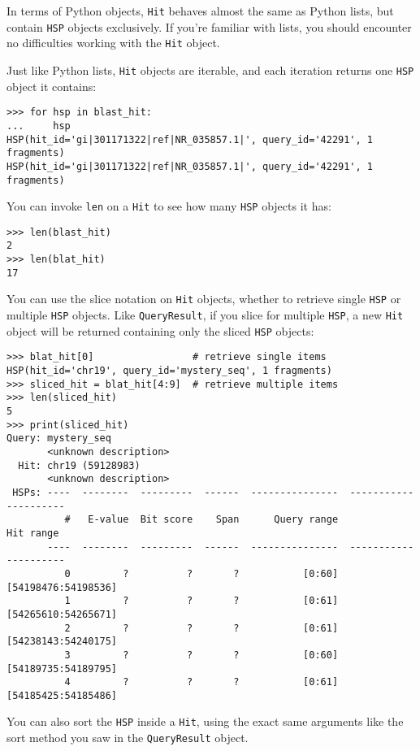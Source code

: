 In terms of Python objects, \verb|Hit| behaves almost the same as Python lists,
but contain \verb|HSP| objects exclusively. If you're familiar with lists, you
should encounter no difficulties working with the \verb|Hit| object.

Just like Python lists, \verb|Hit| objects are iterable, and each iteration
returns one \verb|HSP| object it contains:

\begin{verbatim}
>>> for hsp in blast_hit:
...     hsp
HSP(hit_id='gi|301171322|ref|NR_035857.1|', query_id='42291', 1 fragments)
HSP(hit_id='gi|301171322|ref|NR_035857.1|', query_id='42291', 1 fragments)
\end{verbatim}

You can invoke \verb|len| on a \verb|Hit| to see how many \verb|HSP| objects it
has:

\begin{verbatim}
>>> len(blast_hit)
2
>>> len(blat_hit)
17
\end{verbatim}

You can use the slice notation on \verb|Hit| objects, whether to retrieve single
\verb|HSP| or multiple \verb|HSP| objects. Like \verb|QueryResult|, if you slice
for multiple \verb|HSP|, a new \verb|Hit| object will be returned containing
only the sliced \verb|HSP| objects:

\begin{verbatim}
>>> blat_hit[0]                 # retrieve single items
HSP(hit_id='chr19', query_id='mystery_seq', 1 fragments)
>>> sliced_hit = blat_hit[4:9]  # retrieve multiple items
>>> len(sliced_hit)
5
>>> print(sliced_hit)
Query: mystery_seq
       <unknown description>
  Hit: chr19 (59128983)
       <unknown description>
 HSPs: ----  --------  ---------  ------  ---------------  ---------------------
          #   E-value  Bit score    Span      Query range              Hit range
       ----  --------  ---------  ------  ---------------  ---------------------
          0         ?          ?       ?           [0:60]    [54198476:54198536]
          1         ?          ?       ?           [0:61]    [54265610:54265671]
          2         ?          ?       ?           [0:61]    [54238143:54240175]
          3         ?          ?       ?           [0:60]    [54189735:54189795]
          4         ?          ?       ?           [0:61]    [54185425:54185486]
\end{verbatim}

You can also sort the \verb|HSP| inside a \verb|Hit|, using the exact same
arguments like the sort method you saw in the \verb|QueryResult| object.

